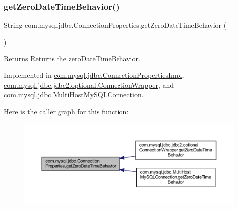 \subsubsection{\texorpdfstring{get\+Zero\+Date\+Time\+Behavior()}{getZeroDateTimeBehavior()}}
{\footnotesize\ttfamily String com.\+mysql.\+jdbc.\+Connection\+Properties.\+get\+Zero\+Date\+Time\+Behavior (\begin{DoxyParamCaption}{ }\end{DoxyParamCaption})}

\begin{DoxyReturn}{Returns}
Returns the zero\+Date\+Time\+Behavior. 
\end{DoxyReturn}


Implemented in \mbox{\hyperlink{classcom_1_1mysql_1_1jdbc_1_1_connection_properties_impl_afdf94172a5573fd5993f1253bf82ac20}{com.\+mysql.\+jdbc.\+Connection\+Properties\+Impl}}, \mbox{\hyperlink{classcom_1_1mysql_1_1jdbc_1_1jdbc2_1_1optional_1_1_connection_wrapper_a018005289e60ac341a0911f9e1f9dbb8}{com.\+mysql.\+jdbc.\+jdbc2.\+optional.\+Connection\+Wrapper}}, and \mbox{\hyperlink{classcom_1_1mysql_1_1jdbc_1_1_multi_host_my_s_q_l_connection_a7f3732fae7bbb72f1fdccbe5fe5931bd}{com.\+mysql.\+jdbc.\+Multi\+Host\+My\+S\+Q\+L\+Connection}}.

Here is the caller graph for this function\+:\nopagebreak
\begin{figure}[H]
\begin{center}
\leavevmode
\includegraphics[width=350pt]{interfacecom_1_1mysql_1_1jdbc_1_1_connection_properties_a1101064e308d3d8aabe9560851a5d6b6_icgraph}
\end{center}
\end{figure}
\mbox{\label{interfacecom_1_1mysql_1_1jdbc_1_1_connection_properties_ac1ed5c3bc5f7f6c977f499b6560ef5a4}} 
